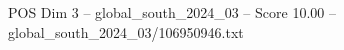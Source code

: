 \begin{textsample}{POS Dim 3 – global\_south\_2024\_03 – Score 10.00 – global\_south\_2024\_03/106950946.txt}
\end{textsample}

